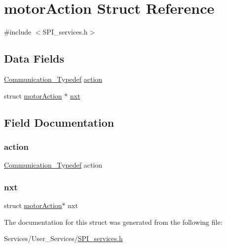 \hypertarget{structmotor_action}{}\section{motor\+Action Struct Reference}
\label{structmotor_action}


{\ttfamily \#include $<$S\+P\+I\+\_\+services.\+h$>$}

\subsection*{Data Fields}
\begin{DoxyCompactItemize}
\item 
\hyperlink{struct_communication___typedef}{Communication\+\_\+\+Typedef} \hyperlink{structmotor_action_af13cf3ed13498241f506181c965221e7}{action}
\item 
struct \hyperlink{structmotor_action}{motor\+Action} $\ast$ \hyperlink{structmotor_action_a9a8fcc97b638a341da9896c375b55aee}{nxt}
\end{DoxyCompactItemize}


\subsection{Field Documentation}
\mbox{\label{structmotor_action_af13cf3ed13498241f506181c965221e7}} 
\subsubsection{\texorpdfstring{action}{action}}
{\footnotesize\ttfamily \hyperlink{struct_communication___typedef}{Communication\+\_\+\+Typedef} action}

\mbox{\label{structmotor_action_a9a8fcc97b638a341da9896c375b55aee}} 
\subsubsection{\texorpdfstring{nxt}{nxt}}
{\footnotesize\ttfamily struct \hyperlink{structmotor_action}{motor\+Action}$\ast$ nxt}



The documentation for this struct was generated from the following file\+:\begin{DoxyCompactItemize}
\item 
Services/\+User\+\_\+\+Services/\hyperlink{_s_p_i__services_8h}{S\+P\+I\+\_\+services.\+h}\end{DoxyCompactItemize}
